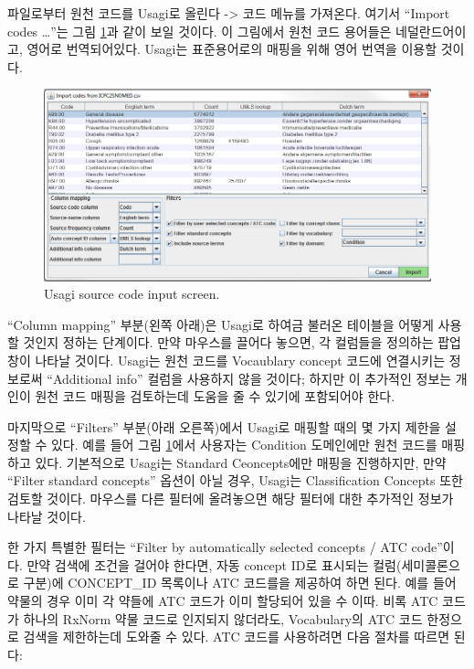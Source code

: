 \documentclass[11pt]{book}
\theoremstyle{definition}
\theoremstyle{definition}
\theoremstyle{definition}
\theoremstyle{remark}
\begin{document}
파일로부터 원천 코드를 Usagi로 올린다 -\textgreater{} 코드 메뉴를
가져온다. 여기서 ``Import codes \ldots{}''는 그림
\ref{fig:usagiImport}과 같이 보일 것이다. 이 그림에서 원천 코드 용어들은
네덜란드어이고, 영어로 번역되어있다. Usagi는 표준용어로의 매핑을 위해
영어 번역을 이용할 것이다.

\begin{figure}

{\centering \includegraphics[width=1\linewidth]{images/ExtractTransformLoad/usagiImport} 

}

\caption{Usagi source code input screen.}\label{fig:usagiImport}
\end{figure}

``Column mapping'' 부분(왼쪽 아래)은 Usagi로 하여금 불러온 테이블을
어떻게 사용할 것인지 정하는 단계이다. 만약 마우스를 끌어다 놓으면, 각
컬럼들을 정의하는 팝업창이 나타날 것이다. Usagi는 원천 코드를 Vocaublary
concept 코드에 연결시키는 정보로써 ``Additional info'' 컬럼을 사용하지
않을 것이다; 하지만 이 추가적인 정보는 개인이 원천 코드 매핑을
검토하는데 도움을 줄 수 있기에 포함되어야 한다.

마지막으로 ``Filters'' 부분(아래 오른쪽)에서 Usagi로 매핑할 때의 몇 가지
제한을 설정할 수 있다. 예를 들어 그림 \ref{fig:usagiImport}에서 사용자는
Condition 도메인에만 원천 코드를 매핑하고 있다. 기본적으로 Usagi는
Standard Ceoncepts에만 매핑을 진행하지만, 만약 ``Filter standard
concepts'' 옵션이 아닐 경우, Usagi는 Classification Concepts 또한 검토할
것이다. 마우스를 다른 필터에 올려놓으면 해당 필터에 대한 추가적인 정보가
나타날 것이다.

한 가지 특별한 필터는 ``Filter by automatically selected concepts / ATC
code''이다. 만약 검색에 조건을 걸어야 한다면, 자동 concept ID로 표시되는
컬럼(세미콜론으로 구분)에 CONCEPT\_ID 목록이나 ATC 코드를을 제공하여
하면 된다. 예를 들어 약물의 경우 이미 각 약들에 ATC 코드가 이미 할당되어
있을 수 이따. 비록 ATC 코드가 하나의 RxNorm 약물 코드로 인지되지
않더라도, Vocabulary의 ATC 코드 한정으로 검색을 제한하는데 도와줄 수
있다. ATC 코드를 사용하려면 다음 절차를 따르면 된다:
\end{document}
